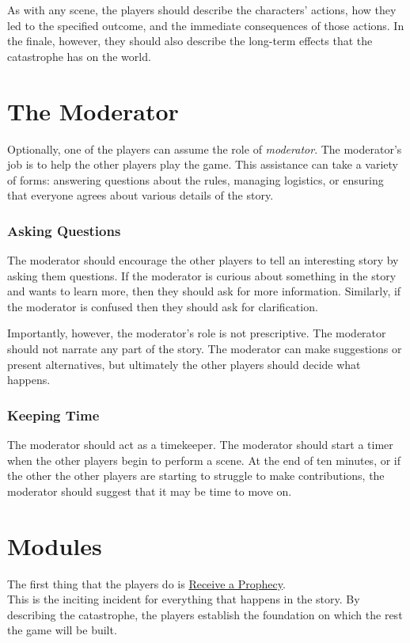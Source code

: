 \documentclass[12pt, a5paper, parskip=half-]{scrartcl}
\begin{document}
As with any scene, the players should describe the characters' actions, how they led to the specified outcome, and the immediate consequences of those actions.
In the finale, however, they should also describe the long-term effects that the catastrophe has on the world.



\newpage

\section*{The Moderator} \label{section:the-moderator}
Optionally, one of the players can assume the role of \emph{moderator}. The moderator's job is to help the other players play the game. This assistance can take a variety of forms: answering questions about the rules, managing logistics, or ensuring that everyone agrees about various details of the story.

\subsubsection*{Asking Questions} \label{subsubsection:asking-questions}
The moderator should encourage the other players to tell an interesting story by asking them questions.  If the moderator is curious about something in the story and wants to learn more, then they should ask for more information.  Similarly, if the moderator is confused then they should ask for clarification.

Importantly, however, the moderator's role is not prescriptive.  The moderator should not narrate any part of the story. The moderator can make suggestions or present alternatives, but ultimately the other players should decide what happens.

\subsubsection*{Keeping Time} \label{subsubsection:keeeping-time}
The moderator should act as a timekeeper. 
The moderator should start a timer when the other players begin to perform a scene.
At the end of ten minutes, or if the other the other players are starting to struggle to make contributions, the moderator should suggest that it may be time to move on.

\newpage

\section*{Modules} \label{section:modules}
The first thing that the players do is \hyperref[subsection:receive-a-prophecy]{\cinzel \small Receive a Prophecy}.  \\
This is the inciting incident for everything that happens in the story.
By describing the catastrophe, the players establish the foundation on which the rest the game will be built.
\end{document}

